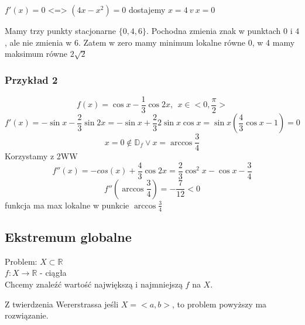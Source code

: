 \documentclass{article}
\begin{document}
$ f'(x) = 0 $ <=> $(4x-x^2) = 0$  dostajemy $x=4\ v\ x=0$

Mamy trzy punkty stacjonarne $\{ 0,4,6 \}$. Pochodna zmienia znak w punktach $0$ i $4$, ale nie zmienia w $6$.
Zatem w zero mamy minimum lokalne równe 0, w 4 mamy maksimum równe $2\sqrt{2}$

\subsubsection{Przykład 2}
$$f(x) = \cos{x} - \frac{1}{3}\cos{2x}, \ \ x \in <0,\frac{\pi}{2}>$$
$$f'(x) = -\sin{x} - \frac{2}{3}\sin{2x} = -\sin{x} + \frac{2}{3}2\sin{x}\cos{x} = \sin{x}\left(\frac{4}{3}\cos{x} -1\right) = 0$$
$$ x = 0 \not\in \mathbb{D}_f \vee x = \arccos{\frac{3}{4}}$$
Korzystamy z 2WW
$$f''(x) = -cos(x) + \frac{4}{3}\cos{2x} = \frac{2}{3}\cos^2{x} - \cos{x} - \frac{3}{4}$$
$$f''(\arccos{\frac{3}{4}}) = -\frac{7}{12} < 0$$
funkcja ma max lokalne w punkcie $\arccos{\frac{3}{4}}$

\subsection{Ekstremum globalne}
Problem:
$ X \subset \mathbb{R} $\\
$ f:X \to \mathbb{R}$ - ciągła \\
Chcemy znaleźć wartość największą i najmniejszą $f$ na $X$.

Z twierdzenia Wererstrassa jeśli $X = <a,b>$, to problem powyższy ma rozwiązanie.
\end{document}
